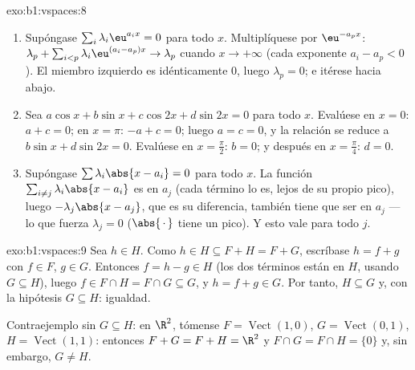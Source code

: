 \begin{solution}{exo:b1:vspaces:8}
\begin{enumerate}
  \item Supóngase $\sum_{i} \lambda_i \eu^{a_i x} = 0$ para todo
        $x$. Multiplíquese por $\eu^{-a_p x}$: $\lambda_p +
        \sum_{i < p} \lambda_i \eu^{(a_i - a_p)x} \to \lambda_p$
        cuando $x \to +\infty$ (cada exponente $a_i - a_p < 0$). El
        miembro izquierdo es idénticamente $0$, luego
        $\lambda_p = 0$; e itérese hacia abajo.
  \item Sea $a\cos x + b \sin x + c \cos 2x + d\sin 2x = 0$ para
        todo $x$. Evalúese en $x = 0$: $a + c = 0$; en $x = \pi$:
        $-a + c = 0$; luego $a = c = 0$, y la relación se reduce a
        $b\sin x + d \sin 2x = 0$. Evalúese en $x = \frac\pi2$:
        $b = 0$; y después en $x = \frac\pi4$: $d = 0$.
  \item Supóngase $\sum \lambda_i \abs{x - a_i} = 0$ para todo $x$.
        La función $\sum_{i \neq j} \lambda_i\abs{x - a_i}$ es
         en $a_j$ (cada término lo es, lejos de su propio
        pico), luego $-\lambda_j \abs{x - a_j}$, que es su
        diferencia, también tiene que ser  en $a_j$ --- lo
        que fuerza $\lambda_j = 0$ ($\abs{\,\cdot\,}$ tiene un pico).
        Y esto vale para todo $j$.
\end{enumerate}
\end{solution}

\begin{solution}{exo:b1:vspaces:9}
Sea $h \in H$. Como $h \in H \subseteq F + H = F + G$, escríbase
$h = f + g$ con $f \in F$, $g \in G$. Entonces $f = h - g \in H$ (los
dos términos están en $H$, usando $G \subseteq H$), luego
$f \in F \cap H = F \cap G \subseteq G$, y $h = f + g \in G$. Por
tanto, $H \subseteq G$ y, con la hipótesis $G \subseteq H$: igualdad.

Contraejemplo sin $G \subseteq H$: en $\R^2$, tómense
$F = \operatorname{Vect}(1,0)$, $G = \operatorname{Vect}(0,1)$,
$H = \operatorname{Vect}(1,1)$: entonces $F + G = F + H = \R^2$ y
$F \cap G = F \cap H = \{0\}$ y, sin embargo, $G \neq H$.
\end{solution}

